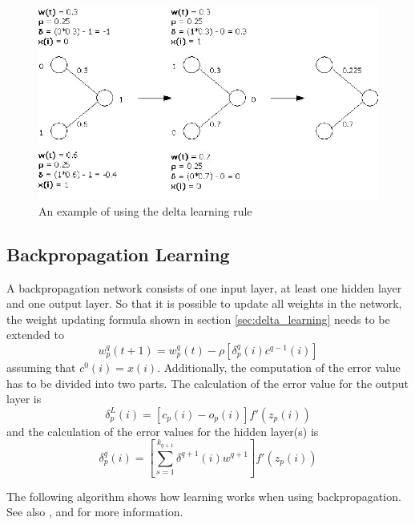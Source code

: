 \begin{figure}[htbp]
	\vspace{1.5em}
	\begin{center}
		\includegraphics[width=0.8\columnwidth]{graphics/show_delta}
	\end{center}
	\vspace{-1em}
	\caption{An example of using the delta learning rule}
	\label{delta_learning_ex}
\end{figure}

\subsection{Backpropagation Learning}
\label{sec:backpropagation}

A backpropagation network consists of one input layer, at least one hidden layer and one output layer. So that it is possible to update all weights in the network, the weight updating formula shown in section \ref{sec:delta_learning} needs to be extended to
\begin{equation} w^q_p(t+1) =w^q_p(t) - \rho[\delta^q_p(i)c^{q-1}(i)] \end{equation}
assuming that $c^0(i) = x(i)$. Additionally, the computation of the error value has to be divided into two parts. The calculation of the error value for the output layer is
\begin{equation} \delta^L_p(i) = [c_p(i) - o_p(i)]f'(z_p(i)) \end{equation}
and the calculation of the error values for the hidden layer(s) is
\begin{equation} \delta^q_p(i) = [\sum_{s=1}^{k_{q+1}} \delta^{q+1}(i)w^{q+1}]f'(z_p(i)) \end{equation}

The following algorithm shows how learning works when using backpropagation. See also \cite{backpropagation}, \cite{back-propagation} and \cite[p.187]{pattern} for more information.

